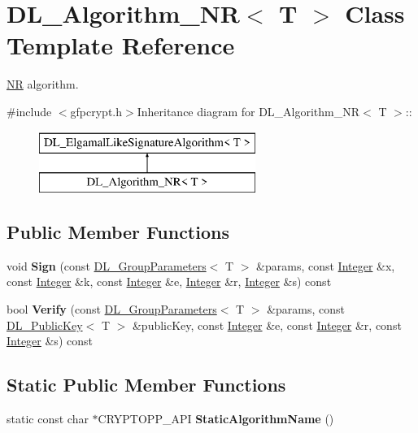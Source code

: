 \hypertarget{class_d_l___algorithm___n_r}{
\section{DL\_\-Algorithm\_\-NR$<$ T $>$ Class Template Reference}
\label{class_d_l___algorithm___n_r}
}


\hyperlink{struct_n_r}{NR} algorithm.  


{\ttfamily \#include $<$gfpcrypt.h$>$}Inheritance diagram for DL\_\-Algorithm\_\-NR$<$ T $>$::\begin{figure}[H]
\begin{center}
\leavevmode
\includegraphics[height=2cm]{class_d_l___algorithm___n_r}
\end{center}
\end{figure}
\subsection*{Public Member Functions}
\begin{DoxyCompactItemize}
\item 
\hypertarget{class_d_l___algorithm___n_r_a1bec206f59857977ceca6fd1c94130b9}{
void {\bfseries Sign} (const \hyperlink{class_d_l___group_parameters}{DL\_\-GroupParameters}$<$ T $>$ \&params, const \hyperlink{class_integer}{Integer} \&x, const \hyperlink{class_integer}{Integer} \&k, const \hyperlink{class_integer}{Integer} \&e, \hyperlink{class_integer}{Integer} \&r, \hyperlink{class_integer}{Integer} \&s) const }
\label{class_d_l___algorithm___n_r_a1bec206f59857977ceca6fd1c94130b9}

\item 
\hypertarget{class_d_l___algorithm___n_r_a4ae63cf056d9f3bf8395fc670f1f608a}{
bool {\bfseries Verify} (const \hyperlink{class_d_l___group_parameters}{DL\_\-GroupParameters}$<$ T $>$ \&params, const \hyperlink{class_d_l___public_key}{DL\_\-PublicKey}$<$ T $>$ \&publicKey, const \hyperlink{class_integer}{Integer} \&e, const \hyperlink{class_integer}{Integer} \&r, const \hyperlink{class_integer}{Integer} \&s) const }
\label{class_d_l___algorithm___n_r_a4ae63cf056d9f3bf8395fc670f1f608a}

\end{DoxyCompactItemize}
\subsection*{Static Public Member Functions}
\begin{DoxyCompactItemize}
\item 
\hypertarget{class_d_l___algorithm___n_r_a56cd84dd0566ef94554e837765730740}{
static const char $\ast$CRYPTOPP\_\-API {\bfseries StaticAlgorithmName} ()}
\label{class_d_l___algorithm___n_r_a56cd84dd0566ef94554e837765730740}

\end{DoxyCompactItemize}


